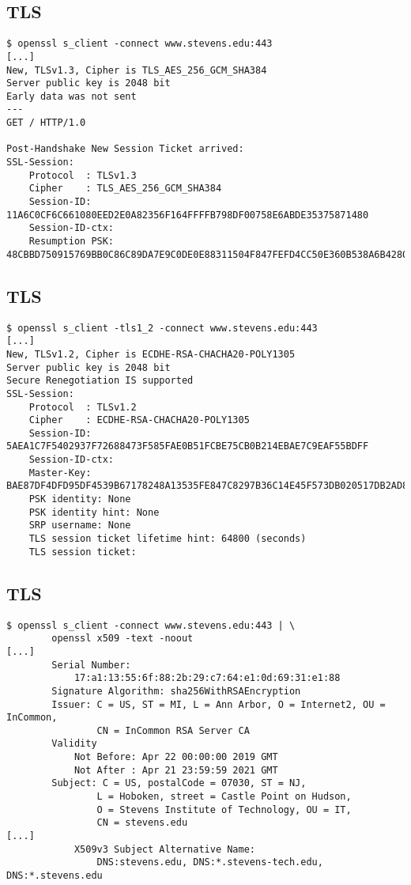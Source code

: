 \documentclass[xga]{xdvislides}
\begin{document}
\subsection{TLS}
\begin{verbatim}
$ openssl s_client -connect www.stevens.edu:443
[...]
New, TLSv1.3, Cipher is TLS_AES_256_GCM_SHA384
Server public key is 2048 bit
Early data was not sent
---
GET / HTTP/1.0

Post-Handshake New Session Ticket arrived:
SSL-Session:
    Protocol  : TLSv1.3
    Cipher    : TLS_AES_256_GCM_SHA384
    Session-ID: 11A6C0CF6C661080EED2E0A82356F164FFFFB798DF00758E6ABDE35375871480
    Session-ID-ctx:
    Resumption PSK: 48CBBD750915769BB0C86C89DA7E9C0DE0E88311504F847FEFD4CC50E360B538A6B4280A2860DEA0D3D7A5EF9FF817A3
\end{verbatim}

\subsection{TLS}
\begin{verbatim}
$ openssl s_client -tls1_2 -connect www.stevens.edu:443
[...]
New, TLSv1.2, Cipher is ECDHE-RSA-CHACHA20-POLY1305
Server public key is 2048 bit
Secure Renegotiation IS supported
SSL-Session:
    Protocol  : TLSv1.2
    Cipher    : ECDHE-RSA-CHACHA20-POLY1305
    Session-ID: 5AEA1C7F5402937F72688473F585FAE0B51FCBE75CB0B214EBAE7C9EAF55BDFF
    Session-ID-ctx: 
    Master-Key: BAE87DF4DFD95DF4539B67178248A13535FE847C8297B36C14E45F573DB020517DB2AD87B792AE51D173E72585899FCF
    PSK identity: None
    PSK identity hint: None
    SRP username: None
    TLS session ticket lifetime hint: 64800 (seconds)
    TLS session ticket:
\end{verbatim}

\subsection{TLS}
\smallish
\begin{verbatim}
$ openssl s_client -connect www.stevens.edu:443 | \
        openssl x509 -text -noout
[...]
        Serial Number:
            17:a1:13:55:6f:88:2b:29:c7:64:e1:0d:69:31:e1:88
        Signature Algorithm: sha256WithRSAEncryption
        Issuer: C = US, ST = MI, L = Ann Arbor, O = Internet2, OU = InCommon,
                CN = InCommon RSA Server CA   
        Validity
            Not Before: Apr 22 00:00:00 2019 GMT
            Not After : Apr 21 23:59:59 2021 GMT
        Subject: C = US, postalCode = 07030, ST = NJ,
                L = Hoboken, street = Castle Point on Hudson,
                O = Stevens Institute of Technology, OU = IT,
                CN = stevens.edu
[...]
            X509v3 Subject Alternative Name: 
                DNS:stevens.edu, DNS:*.stevens-tech.edu, DNS:*.stevens.edu
\end{verbatim}
\Normalsize
\end{document}
